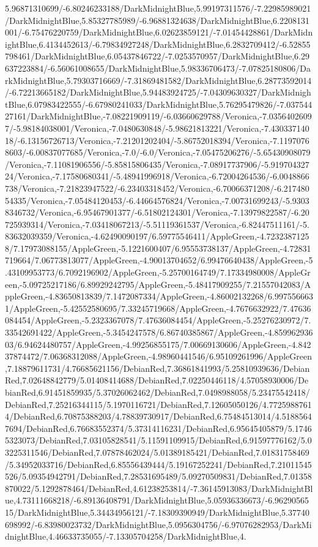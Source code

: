 {\begin{tikzternal}
5.96871310699/-6.80246233188/DarkMidnightBlue,5.99197311576/-7.22985989021/DarkMidnightBlue,5.85327785989/-6.96881324638/DarkMidnightBlue,6.2208131001/-6.75476220759/DarkMidnightBlue,6.02623859121/-7.01454428861/DarkMidnightBlue,6.4134452613/-6.79834927248/DarkMidnightBlue,6.2832709412/-6.52855798461/DarkMidnightBlue,6.05437846722/-7.0253570957/DarkMidnightBlue,6.29637223884/-6.56061008655/DarkMidnightBlue,5.98336706473/-7.07825180806/DarkMidnightBlue,5.79303716669/-7.31869481582/DarkMidnightBlue,6.28773592014/-6.72213665182/DarkMidnightBlue,5.94483924725/-7.04309630327/DarkMidnightBlue,6.07983422555/-6.67980241033/DarkMidnightBlue,5.76295479826/-7.03754427161/DarkMidnightBlue,-7.08221909119/-6.03660629788/Veronica,-7.03564026097/-5.98184038001/Veronica,-7.0480630848/-5.98621813221/Veronica,-7.43033714018/-6.13156726713/Veronica,-7.21201202404/-5.86752018394/Veronica,-7.11970768603/-6.00837077685/Veronica,-7.0/-6.0/Veronica,-7.05475206276/-5.65430908079/Veronica,-7.11081906556/-5.85815806435/Veronica,-7.08917737906/-5.91970432724/Veronica,-7.17580680341/-5.48941996918/Veronica,-6.72004264536/-6.0048866738/Veronica,-7.21823947522/-6.23403318452/Veronica,-6.70066371208/-6.21748054335/Veronica,-7.05484120453/-6.44664576824/Veronica,-7.00731699243/-5.93038346732/Veronica,-6.95467901377/-6.51802124301/Veronica,-7.13979822587/-6.20725939314/Veronica,-7.03418067213/-5.51119361537/Veronica,-6.82447511161/-5.83632039359/Veronica,-4.62490090197/6.59775546411/AppleGreen,-4.72323871258/7.17973088155/AppleGreen,-5.1221600407/6.95553738137/AppleGreen,-4.72831719664/7.06773813077/AppleGreen,-4.90013704652/6.99476640438/AppleGreen,-5.43109953773/6.7092196902/AppleGreen,-5.25700164749/7.17334980008/AppleGreen,-5.09725217186/6.89929242795/AppleGreen,-5.48417909255/7.21557042083/AppleGreen,-4.83650813839/7.1472087334/AppleGreen,-4.86002132268/6.9975566631/AppleGreen,-5.42552580695/7.33245719668/AppleGreen,-4.7676632922/7.47636084454/AppleGreen,-5.2323367078/7.47636084454/AppleGreen,-5.25276230972/7.33542691422/AppleGreen,-5.3454247578/6.86740385867/AppleGreen,-4.85996293603/6.94624480757/AppleGreen,-4.99256855175/7.00669130606/AppleGreen,-4.84237874472/7.06368312088/AppleGreen,-4.98960441546/6.95109261996/AppleGreen,7.18879611731/4.76685621156/DebianRed,7.36861841993/5.25810939636/DebianRed,7.02648842779/5.01408414688/DebianRed,7.02250446118/4.57058930006/DebianRed,6.91451859935/5.37026062462/DebianRed,7.0498988058/5.23475542418/DebianRed,7.25216344115/5.1970116721/DebianRed,7.12605050126/4.77259887614/DebianRed,6.70875388203/4.78839730917/DebianRed,6.75484513014/4.51885647694/DebianRed,6.76683552374/5.37314116231/DebianRed,6.95645405879/5.17465323073/DebianRed,7.03105828541/5.11591109915/DebianRed,6.91597776162/5.03225311546/DebianRed,7.07878462024/5.01389185421/DebianRed,7.01831758469/5.34952033716/DebianRed,6.85556439444/5.19167252241/DebianRed,7.21011545526/5.09354942791/DebianRed,7.28531695489/5.09270509831/DebianRed,7.01358870022/5.1292878464/DebianRed,4.61238253814/-7.36145913083/DarkMidnightBlue,4.73111668218/-6.89136408791/DarkMidnightBlue,5.05936336673/-6.9629056515/DarkMidnightBlue,5.34434956121/-7.18309390949/DarkMidnightBlue,5.37740698992/-6.83980023732/DarkMidnightBlue,5.0956304756/-6.97076282953/DarkMidnightBlue,4.46633735055/-7.13305704258/DarkMidnightBlue,4.
\end{tikzternal}}
